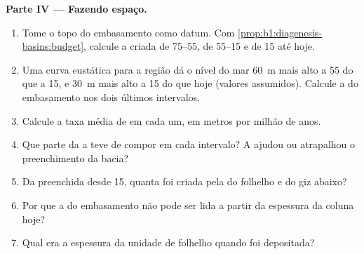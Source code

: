 \begin{problem}
\noindent\textbf{Parte IV --- Fazendo espaço.}
\begin{enumerate}[resume]
  \item Tome o topo do embasamento como datum. Com \cref{prop:b1:diagenesis-basins:budget},
        calcule a  criada de \qtyrange{75}{55}{\Ma}, de \qtyrange{55}{15}{\Ma} e de
        \qty{15}{\Ma} até hoje.
  \item Uma curva eustática para a região dá o nível do mar \qty{60}{m} mais alto a
        \qty{55}{\Ma} do que a \qty{15}{\Ma}, e \qty{30}{m} mais alto a \qty{15}{\Ma} do que hoje
        (valores assumidos). Calcule a  do embasamento nos dois últimos intervalos.
  \item Calcule a taxa média de  em cada um, em metros por milhão de anos.
  \item Que parte da  a  teve de compor em cada intervalo? A 
        ajudou ou atrapalhou o preenchimento da bacia?
  \item Da  preenchida desde \qty{15}{\Ma}, quanta foi criada pela  do
        folhelho e do giz abaixo?
  \item Por que a  do embasamento não pode ser lida a partir da espessura da coluna
        hoje?
  \item Qual era a espessura da unidade de folhelho quando foi depositada?
\end{enumerate}
\end{problem}
